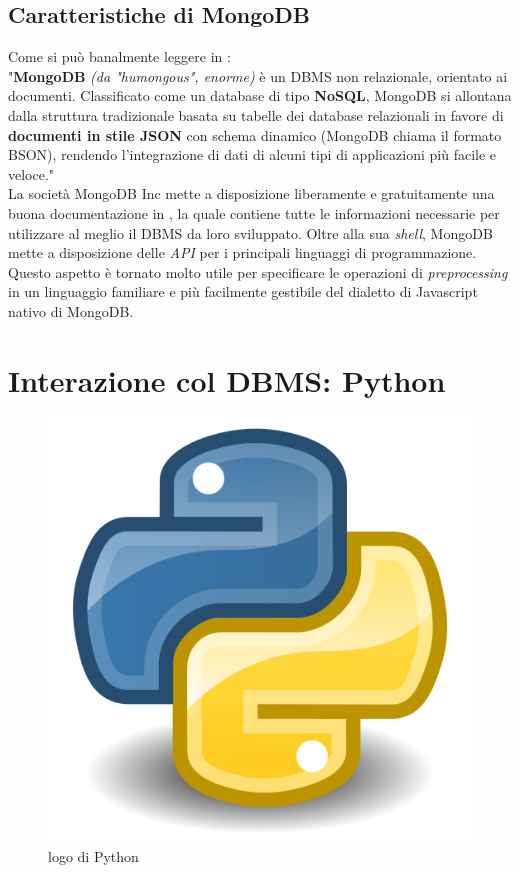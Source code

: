     \subsection{Caratteristiche di MongoDB}

        Come si può banalmente leggere in \cite{mongowiki}: \\
        
        "\textbf{MongoDB} \textit{(da "humongous", enorme)} è un DBMS non relazionale, orientato ai documenti. Classificato come un database di tipo \textbf{NoSQL}, MongoDB si allontana dalla struttura tradizionale basata su tabelle dei database relazionali in favore di \textbf{documenti in stile JSON} con schema dinamico (MongoDB chiama il formato BSON), rendendo l'integrazione di dati di alcuni tipi di applicazioni più facile e veloce." \\

        La società MongoDB Inc mette a disposizione liberamente e gratuitamente una buona documentazione in \cite{mongodb}, la quale contiene tutte le informazioni necessarie per utilizzare al meglio il DBMS da loro sviluppato. Oltre alla sua \textit{shell}, MongoDB mette a disposizione delle \textit{API} per i principali linguaggi di programmazione. Questo aspetto è tornato molto utile per specificare le operazioni di \textit{preprocessing} in un linguaggio familiare e più facilmente gestibile del dialetto di Javascript nativo di MongoDB.

\section{Interazione col DBMS: Python}

    \begin{figure}
        \centering
        \caption{logo di Python}
        \label{python_logo}
    	\includegraphics[scale=0.12]{img/python.png}
    \end{figure}

